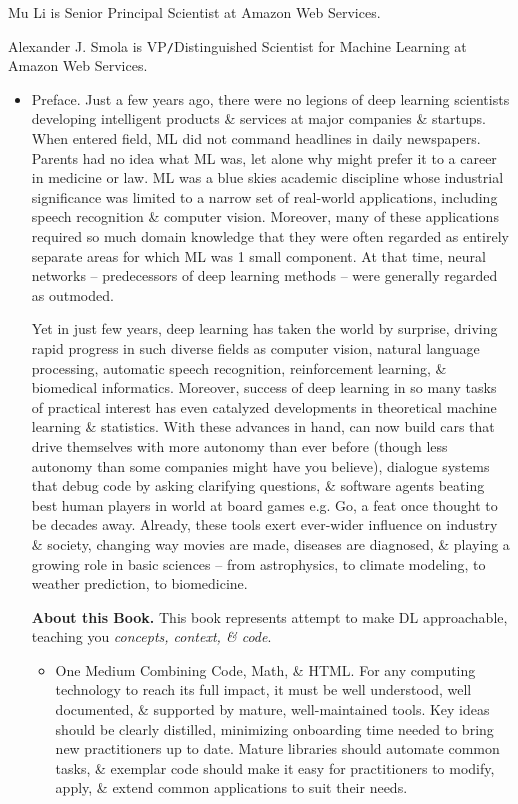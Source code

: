 \documentclass{article}
\begin{document}
{\sc Mu Li} is Senior Principal Scientist at Amazon Web Services.

{\sc Alexander J. Smola} is VP{\tt/}Distinguished Scientist for Machine Learning at Amazon Web Services.
\begin{itemize}
	\item {\sf Preface.} Just a few years ago, there were no legions of deep learning scientists developing intelligent products \& services at major companies \& startups. When entered field, ML did not command headlines in daily newspapers. Parents had no idea what ML was, let alone why might prefer it to a career in medicine or law. ML was a blue skies academic discipline whose industrial significance was limited to a narrow set of real-world applications, including speech recognition \& computer vision. Moreover, many of these applications required so much domain knowledge that they were often regarded as entirely separate areas for which ML was 1 small component. At that time, neural networks -- predecessors of deep learning methods -- were generally regarded as outmoded.
	
	Yet in just few years, deep learning has taken the world by surprise, driving rapid progress in such diverse fields as computer vision, natural language processing, automatic speech recognition, reinforcement learning, \& biomedical informatics. Moreover, success of deep learning in so many tasks of practical interest has even catalyzed developments in theoretical machine learning \& statistics. With these advances in hand, can now build cars that drive themselves with more autonomy than ever before (though less autonomy than some companies might have you believe), dialogue systems that debug code by asking clarifying questions, \& software agents beating best human players in world at board games e.g. Go, a feat once thought to be decades away. Already, these tools exert ever-wider influence on industry \& society, changing way movies are made, diseases are diagnosed, \& playing a growing role in basic sciences -- from astrophysics, to climate modeling, to weather prediction, to biomedicine.
	
	{\bf About this Book.} This book represents attempt to make DL approachable, teaching you {\it concepts, context, \& code}.
	\begin{itemize}
		\item {\sf One Medium Combining Code, Math, \& HTML.} For any computing technology to reach its full impact, it must be well understood, well documented, \& supported by mature, well-maintained tools. Key ideas should be clearly distilled, minimizing onboarding time needed to bring new practitioners up to date. Mature libraries should automate common tasks, \& exemplar code should make it easy for practitioners to modify, apply, \& extend common applications to suit their needs.
		

\end{itemize}
\end{itemize}
\end{document}
